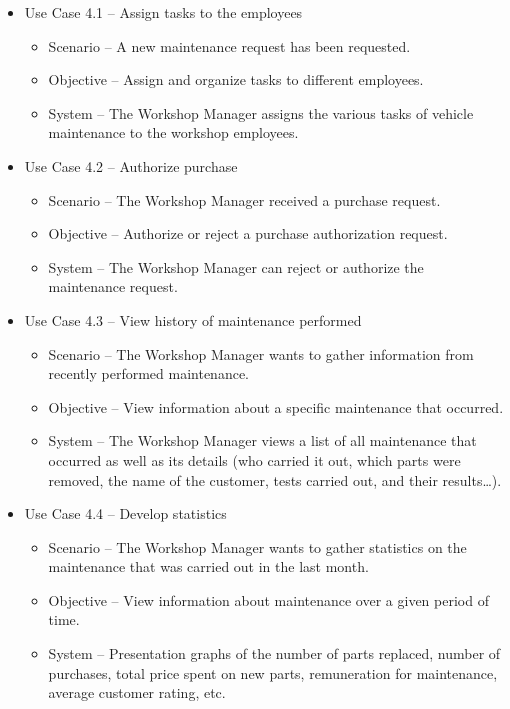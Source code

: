 \begin{itemize}
    \item Use Case 4.1 – Assign tasks to the employees
  \begin{itemize}
    \item Scenario – A new maintenance request has been requested.
    \item Objective – Assign and organize tasks to different employees.
    \item System – The Workshop Manager assigns the various tasks of vehicle maintenance to the workshop employees.
  \end{itemize}
  \item Use Case 4.2 – Authorize purchase
  \begin{itemize}
    \item Scenario –  The Workshop Manager received a purchase request.
    \item Objective – Authorize or reject a purchase authorization request.
    \item System – The Workshop Manager can reject or authorize the maintenance request. 
  \end{itemize}
  \item Use Case 4.3 – View history of maintenance performed
  \begin{itemize}
    \item Scenario – The Workshop Manager wants to gather information from recently performed maintenance.
    \item Objective – View information about a specific maintenance that occurred.
    \item System – The Workshop Manager views a list of all maintenance that occurred as well as its details (who carried it out, which parts were removed, the name of the customer, tests carried out, and their results…). 
  \end{itemize}
  \item Use Case 4.4 – Develop statistics
  \begin{itemize}
    \item Scenario – The Workshop Manager wants to gather statistics on the maintenance that was carried out in the last month.
    \item Objective – View information about maintenance over a given period of time.
    \item System – Presentation graphs of the number of parts replaced, number of purchases, total price spent on new parts, remuneration for maintenance, average customer rating, etc.

\end{itemize}
\end{itemize}
